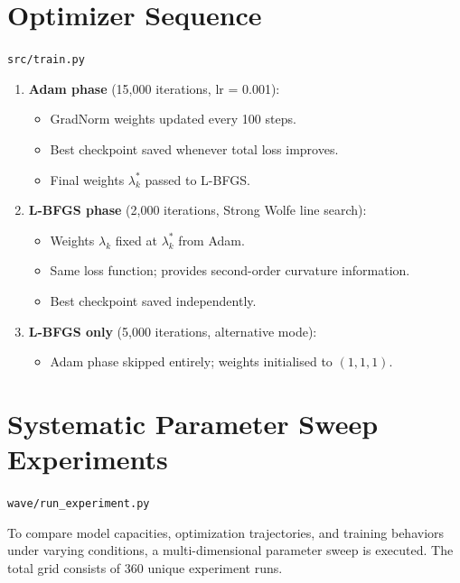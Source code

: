 \documentclass[11pt, a4paper]{article}
\newcommand{\file}[1]{\texttt{#1}}
\begin{document}
\section{Optimizer Sequence}
\file{src/train.py}

\begin{enumerate}
  \item \textbf{Adam phase} (15,000 iterations, lr = 0.001):
    \begin{itemize}
      \item GradNorm weights updated every 100 steps.
      \item Best checkpoint saved whenever total loss improves.
      \item Final weights $\lambda_k^*$ passed to L-BFGS.
    \end{itemize}
  \item \textbf{L-BFGS phase} (2,000 iterations, Strong Wolfe line search):
    \begin{itemize}
      \item Weights $\lambda_k$ fixed at $\lambda_k^*$ from Adam.
      \item Same loss function; provides second-order curvature information.
      \item Best checkpoint saved independently.
    \end{itemize}
  \item \textbf{L-BFGS only} (5,000 iterations, alternative mode):
    \begin{itemize}
      \item Adam phase skipped entirely; weights initialised to $(1,1,1)$.
    \end{itemize}
\end{enumerate}

\section{Systematic Parameter Sweep Experiments}
\file{wave/run\_experiment.py}

To compare model capacities, optimization trajectories, and training behaviors under varying conditions, a multi-dimensional parameter sweep is executed. The total grid consists of 360 unique experiment runs.
\end{document}
